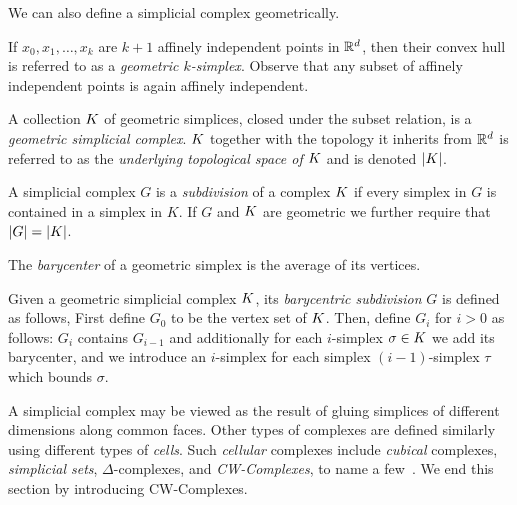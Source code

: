 We can also define a simplicial complex geometrically. 
\begin{definition}
If $x_0, x_1, \ldots, x_k$ are $k+1$ affinely independent points in $\mathbb{R}^d$, then their convex hull is referred to as a \emph{geometric $k$-simplex}. Observe that any subset of affinely independent points is again affinely independent. 
\end{definition}
\begin{definition}
A collection $K$ of geometric simplices, closed under the subset relation, is a \emph{geometric simplicial complex}. $K$ together with the topology it inherits from $\mathbb{R}^d$ is referred to as the \emph{underlying topological space of $K$} and is denoted $|K|$. 
\end{definition}
\begin{definition}[Subdivision]
A simplicial complex $G$ is a \emph{subdivision} of a complex $K$ if every simplex in $G$ is contained in a simplex in $K$. If $G$ and $K$ are geometric we further require that $|G| = |K|$.
\end{definition}
\begin{definition}[Barycenter]
The \emph{barycenter} of a geometric simplex is the average of its vertices.
\end{definition}
\begin{definition}
Given a geometric simplicial complex $K$, its \emph{barycentric subdivision} $G$ is defined as follows, First define $G_0$ to be the vertex set of $K$. Then, define $G_i$ for $i > 0$ as follows: $G_i$ contains $G_{i-1}$ and additionally for each $i$-simplex $\sigma  \in K$ we add its barycenter, and we introduce an $i$-simplex for each simplex $(i-1)$-simplex $\tau$ which bounds $\sigma$.
\end{definition}

A simplicial complex may be viewed as the result of gluing simplices of 
different dimensions along common faces. Other types of complexes are defined 
similarly using different types of \emph{cells}. Such \emph{cellular} complexes include \emph{cubical} complexes, \emph{simplicial sets}, $\Delta$-complexes, and \emph{CW-Complexes}, 
to name a few~\cite{ez-ssc-50,hatcher,kmm-ch-04,m-soat-68}. We end this section by introducing CW-Complexes.


